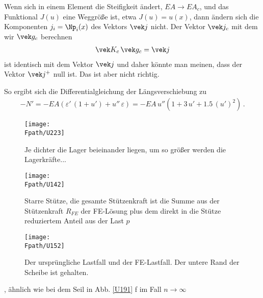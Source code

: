 {{{Wenn sich in einem Element die Steifigkeit \"{a}ndert, $EA \to EA_c$, und das Funktional $J(u)$ eine Weggr\"{o}{\ss}e ist, etwa $J(u) = u(x)$, dann \"{a}ndern sich die Komponenten $j_i = \Np_i(x)$ des Vektors $\vek j$ nicht. Der Vektor $\vek j_c$  mit dem wir $\vek g_c$ berechnen
\begin{align}
\vek K_c\,\vek g_c = \vek j
\end{align}
ist identisch mit dem Vektor $\vek j$ und daher k\"{o}nnte man meinen, dass der Vektor $\vek j^+ $  null ist. Das ist aber nicht richtig.

So ergibt sich die Differentialgleichung der L\"{a}ngsverschiebung zu
\begin{align}
-N' = - EA(\varepsilon'\,(1 + u') + u''\,\varepsilon) = -EA\,u'' (1 + 3\,u' + 1.5\,(u')^2)\,.
\end{align}

\begin{figure}
\centering
{\texttt{[image: \\Fpath/U223]}}
\caption{Je dichter die Lager beieinander liegen, um so gr\"{o}{\ss}er werden die Lagerkr\"{a}fte...}
\label{U223}%
%
\end{figure}%

\begin{figure}[tbp]
\centering
\texttt{[image: \\Fpath/U142]}
\caption{Starre St\"{u}tze, die gesamte St\"{u}tzenkraft ist die Summe aus der St\"{u}tzenkraft $R_{FE}$ der FE-L\"{o}sung plus dem direkt in die St\"{u}tze reduziertem Anteil aus der Last $p$} \label{U142}
\end{figure}%

\begin{figure}
\centering
\if {} \sidecaption \fi
\texttt{[image: \\Fpath/U152]}
\caption{Der urspr\"{u}ngliche Lastfall und der FE-Lastfall. Der untere Rand der Scheibe ist gehalten. }
\label{U152}%
\end{figure}%

, \"{a}hnlich wie bei dem Seil in Abb. \ref{U191} f im Fall $n \to \infty$

}}}
